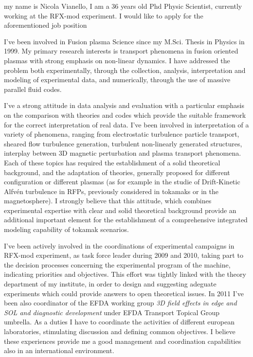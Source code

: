 \documentclass[12pt,stdletter,a4paper,dateno,sigleft]{newlfm}
\begin{document}
\begin{newlfm}
my name is Nicola Vianello, I am a 36 years old Phd Physic Scientist,
currently working at the RFX-mod experiment. I would like to apply for
the aforementioned job position

I've been involved in Fusion plasma Science since my M.Sci. Thesis in
Physics in 1999. My primary research interests is transport phenomena in fusion
oriented plasmas with strong emphasis on non-linear dynamics. I have
addressed the problem both experimentally, through the collection, 
analysis, interpretation and modeling of experimental data, and
numerically, through the use of massive parallel fluid codes. 

I've a strong attitude in
data analysis and evaluation with a particular emphasis on the
comparison with theories and codes which provide the suitable framework for the
correct interpretation of real data. I've been involved in
interpretation of a variety of phenomena, ranging from electrostatic
turbulence particle transport, sheared flow turbulence generation,
turbulent non-linearly generated structures, interplay between 3D
magnetic perturbation and plasma transport phenomena. Each of these
topics has required the establishment of a solid theoretical
background, and the adaptation of theories, generally proposed for
different configuration or different plasmas (as for example in the
studie of Drift-Kinetic Alfv\'en turbulence in RFPs, previously
considered in tokamaks or in the magnetosphere). I strongly believe that this
attitude, which combines experimental expertise  with clear and solid
theoretical background provide an additional important element for the
establishment of a comprehensive integrated modeling capability of
tokamak scenarios. 

I've been actively involved in the coordinations of experimental
campaigns in RFX-mod experiment, as task force leader during 2009 and
2010, taking part to the decision processes concerning the
experimental program of the machine, indicating priorities and
objectives. This effort was tightly linked with the theory department
of my institute, in order to design and suggesting adeguate experiments
which could provide answers to open theoretical issues.
In 2011 I've been also coordinator of the 
EFDA working group \emph{3D field effects in
  edge and SOL and diagnostic development} under EFDA Transport
Topical Group umbrella. As a duties I have to coordinate the
activities of different  european laboratories, stimulating
discussion and defining common objectives. I believe these experiences
provide me a good management and coordination capabilities also in an
international environment. 


\end{newlfm}
\end{document}
